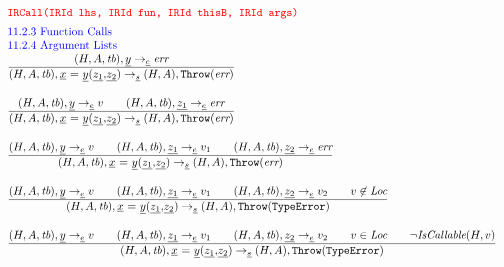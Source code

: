 \[
\begin{array}{l@{~~}l@{~~}ll}
\mtt{\normalsize\inred IRCall(IRId lhs, IRId fun, IRId thisB, IRId args)}\\[.5em]
\mbox{\inblue 11.2.3 Function Calls}\\
\mbox{\inblue 11.2.4 Argument Lists}\\

\frac{\begin{matrix}
\evale, \ir{y} \rightarrow_{\ir\expr} \err
\end{matrix}}{\begin{matrix}
\state, \ircall \rightarrow_{\ir\stmt}
\res, \error
\end{matrix}}
\\[2em]

\frac{\begin{matrix}
\evale, \ir{y} \rightarrow_{\ir\expr} v
\rulesep
\evale, \ir{z_1} \rightarrow_{\ir\expr} \err
\end{matrix}}{\begin{matrix}
\state, \ircall \rightarrow_{\ir\stmt}
\res, \error
\end{matrix}}
\\[2em]

\frac{\begin{matrix}
\evale, \ir{y} \rightarrow_{\ir\expr} v
\rulesep
\evale, \ir{z_1} \rightarrow_{\ir\expr} v_1
\rulesep
\evale, \ir{z_2} \rightarrow_{\ir\expr} \err
\end{matrix}}{\begin{matrix}
\state, \ircall \rightarrow_{\ir\stmt}
\res, \error
\end{matrix}}
\\[2em]

\frac{\begin{matrix}
\evale, \ir{y} \rightarrow_{\ir\expr} v
\rulesep
\evale, \ir{z_1} \rightarrow_{\ir\expr} v_1
\rulesep
\evale, \ir{z_2} \rightarrow_{\ir\expr} v_2
\rulesep
v \not\in \Loc
\end{matrix}}{\begin{matrix}
\state, \ircall \rightarrow_{\ir\stmt}
\res, \thte
\end{matrix}}
\\[2em]

\frac{\begin{matrix}
\evale, \ir{y} \rightarrow_{\ir\expr} v
\rulesep
\evale, \ir{z_1} \rightarrow_{\ir\expr} v_1
\rulesep
\evale, \ir{z_2} \rightarrow_{\ir\expr} v_2
\rulesep
v \in \Loc
\rulesep
\neg\hf{IsCallable}(H,v)
\end{matrix}}{\begin{matrix}
\state, \ircall \rightarrow_{\ir\stmt}
\res, \thte
\end{matrix}}
\\[2em]


\end{array}\]
